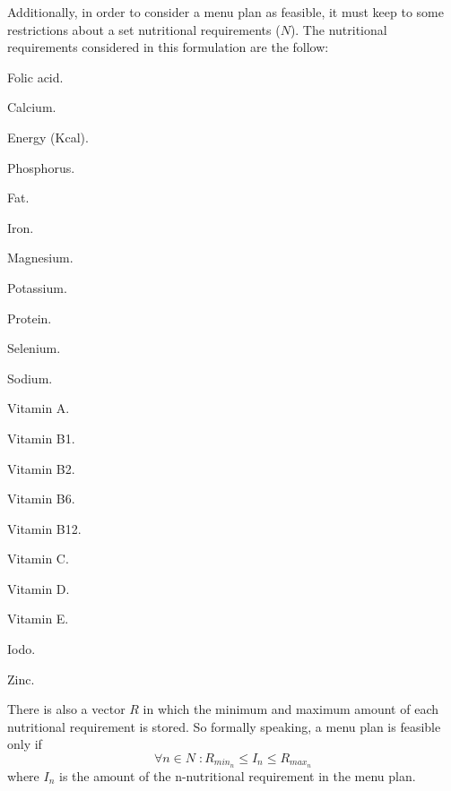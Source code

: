 Additionally, in order to consider a menu plan as feasible, it must keep to some restrictions about a set nutritional requirements ($N$). The nutritional requirements considered in this formulation are the follow:
\begin{AutoMultiColItemize}
    \item Folic acid.
    \item Calcium.
    \item Energy (Kcal).
    \item Phosphorus.
    \item Fat.
    \item Iron.
    \item Magnesium.
    \item Potassium.
    \item Protein.
    \item Selenium.
    \item Sodium.
    \item Vitamin A.
    \item Vitamin B1.
    \item Vitamin B2.
    \item Vitamin B6.
    \item Vitamin B12.
    \item Vitamin C.
    \item Vitamin D.
    \item Vitamin E.
    \item Iodo.
    \item Zinc.
\end{AutoMultiColItemize}
There is also a vector $R$ in which the minimum and maximum amount of each nutritional requirement is stored. So formally speaking, a menu plan is feasible only if
\[
    \forall	 n \in N\; : R_{min_{n}} \leq I_{n} \leq R_{max_{n}}
\]
where $I_{n}$ is the amount of the n-nutritional requirement in the menu plan.
